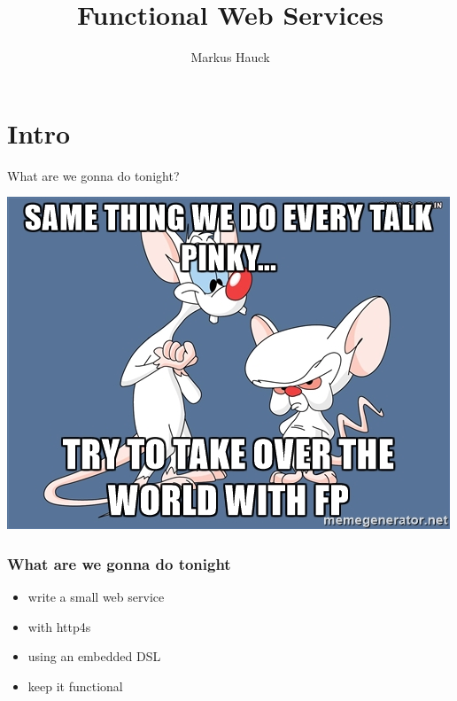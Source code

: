 \documentclass{beamer}
\author{Markus Hauck}
\institute{codecentric AG}
\title{Functional Web Services}
\begin{document}
{
  \begin{frame}
    \titlepage{}
  \end{frame}
}

\section{Intro}

\begin{frame}
  \begin{center}
    \huge
    What are we gonna do tonight?
  \end{center}
\end{frame}

\begin{frame}
  \begin{center}
    \includegraphics[width=0.7\paperwidth]{pics/pinkybrain.jpg}
  \end{center}
\end{frame}

\begin{frame}
  \frametitle{What are we gonna do tonight}
  \begin{itemize}
  \item write a small web service
  \item with http4s
  \item using an embedded DSL
  \item keep it functional
  \end{itemize}
\end{frame}
\end{document}
